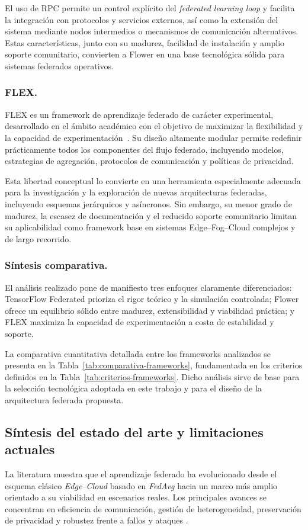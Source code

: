 \documentclass{report}
\begin{document}
El uso de RPC permite un control explícito del \emph{federated learning loop} y facilita la integración con protocolos y servicios externos, así como la extensión del sistema mediante nodos intermedios o mecanismos de comunicación alternativos. Estas características, junto con su madurez, facilidad de instalación y amplio soporte comunitario, convierten a Flower en una base tecnológica sólida para sistemas federados operativos.

\subsubsection{FLEX.}
FLEX es un framework de aprendizaje federado de carácter experimental, desarrollado en el ámbito académico con el objetivo de maximizar la flexibilidad y la capacidad de experimentación~\cite{flexframework2023}. Su diseño altamente modular permite redefinir prácticamente todos los componentes del flujo federado, incluyendo modelos, estrategias de agregación, protocolos de comunicación y políticas de privacidad.

Esta libertad conceptual lo convierte en una herramienta especialmente adecuada para la investigación y la exploración de nuevas arquitecturas federadas, incluyendo esquemas jerárquicos y asíncronos. Sin embargo, su menor grado de madurez, la escasez de documentación y el reducido soporte comunitario limitan su aplicabilidad como framework base en sistemas Edge--Fog--Cloud complejos y de largo recorrido.

\subsubsection{Síntesis comparativa.}
El análisis realizado pone de manifiesto tres enfoques claramente diferenciados: TensorFlow Federated prioriza el rigor teórico y la simulación controlada; Flower ofrece un equilibrio sólido entre madurez, extensibilidad y viabilidad práctica; y FLEX maximiza la capacidad de experimentación a costa de estabilidad y soporte. 

La comparativa cuantitativa detallada entre los frameworks analizados se presenta en la Tabla~\ref{tab:comparativa-frameworks}, fundamentada en los criterios definidos en la Tabla~\ref{tab:criterios-frameworks}. Dicho análisis sirve de base para la selección tecnológica adoptada en este trabajo y para el diseño de la arquitectura federada propuesta.

\subsection{Síntesis del estado del arte y limitaciones actuales}
\label{sec:fl-synthesis-limitations}
La literatura muestra que el aprendizaje federado ha evolucionado desde el esquema clásico \textit{Edge--Cloud} basado en \textit{FedAvg} \cite{mcmahan2017communication} hacia un marco más amplio orientado a su viabilidad en escenarios reales. Los principales avances se concentran en eficiencia de comunicación, gestión de heterogeneidad, preservación de privacidad y robustez frente a fallos y ataques \cite{kairouz2021advances,li2020federated}.
\end{document}
